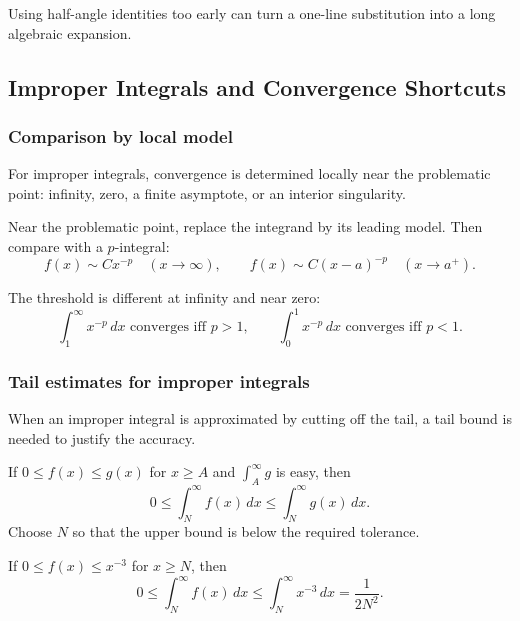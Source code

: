 \begin{commonmistake}
Using half-angle identities too early can turn a one-line substitution into a
long algebraic expansion.
\end{commonmistake}

\newpage
\subsection{Improper Integrals and Convergence Shortcuts}

\subsubsection{Comparison by local model}
\begin{extension}
For improper integrals, convergence is determined locally near the problematic
point: infinity, zero, a finite asymptote, or an interior singularity.
\end{extension}

\begin{examtip}
Near the problematic point, replace the integrand by its leading model.  Then
compare with a \(p\)-integral:
\[
f(x)\sim Cx^{-p}\quad(x\to\infty),
\qquad
f(x)\sim C(x-a)^{-p}\quad(x\to a^+).
\]
\end{examtip}

\begin{commonmistake}
The threshold is different at infinity and near zero:
\[
\int_1^\infty x^{-p}\,dx\text{ converges iff }p>1,
\qquad
\int_0^1x^{-p}\,dx\text{ converges iff }p<1.
\]
\end{commonmistake}

\newpage
\subsubsection{Tail estimates for improper integrals}
\begin{extension}
When an improper integral is approximated by cutting off the tail, a tail bound
is needed to justify the accuracy.
\end{extension}

\begin{examtip}
If \(0\le f(x)\le g(x)\) for \(x\ge A\) and \(\int_A^\infty g\) is easy, then
\[
0\le \int_N^\infty f(x)\,dx\le \int_N^\infty g(x)\,dx.
\]
Choose \(N\) so that the upper bound is below the required tolerance.
\end{examtip}

\begin{examplebox}[title={Power Tail}]
If \(0\le f(x)\le x^{-3}\) for \(x\ge N\), then
\[
0\le\int_N^\infty f(x)\,dx\le\int_N^\infty x^{-3}\,dx=\frac{1}{2N^2}.
\]
\end{examplebox}

